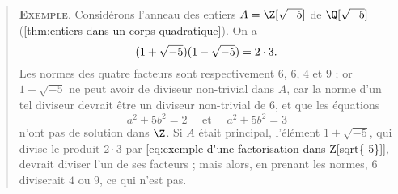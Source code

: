 \documentclass[11pt, useosf,
  title in boldface,
  theorem in new line,
  theorem numbering = section,
  number theorems separately,
]{simplivre}
\begin{document}
    \begin{quote}
        \textsc{\textbf{Exemple}}.
        Considérons l'anneau des entiers \( A = \Z[\sqrt{-5}] \) de \( \Q[\sqrt{-5}] \) (\cref{thm:entiers dans un corps quadratique}). On a
        \begin{equation}\label{eq:exemple d'une factorisation dans Z[sqrt{-5}]}
            (1+\sqrt{-5})(1-\sqrt{-5}) = 2 \cdot 3.
        \end{equation}
        Les normes des quatre facteurs sont respectivement \( 6 \), \( 6 \), \( 4 \) et \( 9 \) ; or \( 1+\sqrt{-5} \) ne peut avoir de diviseur non-trivial dans \( A \), car la norme d'un tel diviseur devrait être un diviseur non-trivial de \( 6 \), et que les équations
        \[
            a^2 + 5b^2 = 2
            \quad \text{ et } \quad
            a^2 + 5b^2 = 3
        \]
        n'ont pas de solution dans \( \Z \). Si \( A \) était principal, l'élément \( 1+\sqrt{-5} \), qui divise le produit \( 2 \cdot 3 \) par \eqref{eq:exemple d'une factorisation dans Z[sqrt{-5}]}, devrait diviser l'un de ses facteurs ; mais alors, en prenant les normes, \( 6 \) diviserait \( 4 \) ou \( 9 \), ce qui n'est pas.
    \end{quote}
\end{document}
